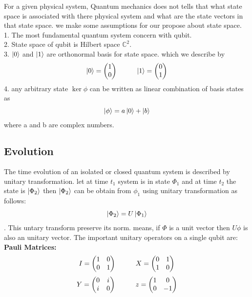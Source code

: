 \documentclass[11 pt]{article}
\theoremstyle{definition}
\theoremstyle{remark}
\newcommand{\di}{i}
\begin{document}
For a given physical system, Quantum mechanics does not tells that what state space is associated with there physical system and what are the state vectors in that state space. we make some assumptions for our propose about state space.\\
1. The most fundamental quantum system concern with qubit.\\
2. State space of qubit is Hilbert space $\mathbb{C}^2$.\\
3. $\ket{0}$ and $\ket{1}$ are orthonormal basis for state space. which we describe by $$\ket{0} = \begin{pmatrix}
           1 \\
           0
\end{pmatrix} \hspace{1cm} \ket{1} = \begin{pmatrix}
           0\\
           1
\end{pmatrix}$$
4. any arbitrary state $\ker{\phi}$ can be written as linear combination of basis states as $$\ket{\phi} = a\ket{0} + \ket{b}$$
where a and b are complex numbers.

\subsection{Evolution}
The time evolution of an isolated or closed quantum system is described by unitary transformation. let at time $t_1$ system is in state $\Phi_1$ and at time $t_2$ the state is $\ket{\Phi_2}$ then $\ket{\Phi_2}$ can be obtain from $\phi_1$ using unitary transformation as follows:
$$\ket{\Phi_2} = U \ket{\Phi_1}$$.
This untary transform preserve its norm. means, if $\Phi$ is a unit vector then $U\phi$ is also an unitary vector. The important unitary operators on a single qubit are:\\
\textbf{Pauli Matrices:} $$I = \begin{pmatrix}
           1 & 0\\
           0 & 1
\end{pmatrix} \hspace{1 cm} X = \begin{pmatrix}
           0 & 1\\
           1 & 0
\end{pmatrix}$$
$$Y = \begin{pmatrix}
           0 & \di\\
           \di & 0
\end{pmatrix} \hspace{1 cm} z = \begin{pmatrix}
           1 & 0\\
           0 & -1
\end{pmatrix}$$
\end{document}
